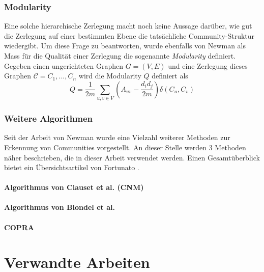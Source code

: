 \cite{Girvan2002}

\subsubsection{Modularity}
\label{sec:modularity}

Eine solche hierarchische Zerlegung macht noch keine Aussage
dar\"uber, wie gut die Zerlegung auf einer bestimmten Ebene die
tats\"achliche Community-Struktur wiedergibt. Um diese Frage zu
beantworten, wurde ebenfalls von Newman als Mass f\"ur die Qualit\"at
einer Zerlegung die sogenannte \emph{Modularity} definiert. Gegeben
einen ungerichteten Graphen $G=(V, E)$ und eine Zerlegung dieses
Graphen $\mathcal{C} = C_1, ..., C_n$ wird die Modularity $Q$
definiert als
\begin{equation}
  \label{eq:modularity}
  Q =
  \frac{1}{2m}\sum_{u, v \in V}\left(A_{uv}-\frac{d_id_j}{2m}\right)\delta(C_u, C_v)
\end{equation}

\subsubsection{Weitere Algorithmen}
\label{sec:algorithmen}

Seit der Arbeit von Newman wurde eine Vielzahl weiterer Methoden zur
Erkennung von Communities vorgestellt. An dieser Stelle werden 3
Methoden n\"aher beschrieben, die in dieser Arbeit verwendet
werden. Einen Gesamt\"uberblick bietet ein \"Ubersichtsartikel von
Fortunato \cite{Fortunato2010}.

\paragraph{Algorithmus von Clauset et al.  (CNM)}
\label{sec:algor-von-girv}

\paragraph{Algorithmus von Blondel et al.}
\label{sec:algor-von-blond}

\paragraph{COPRA}
\label{sec:copra}

\section{Verwandte Arbeiten}
\label{ch:Grundlagen:sec:RelatedWork}

